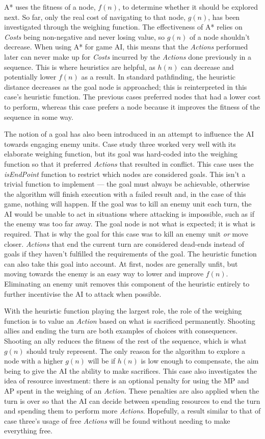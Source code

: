 \documentclass[11pt, a4paper]{report}
\begin{document}
A* uses the fitness of a node, $f(n)$, to determine whether it should be explored next. So far, only the real cost of navigating to that node, $g(n)$, has been investigated through the weighing function. The effectiveness of A* relies on \emph{Costs} being non-negative and never losing value, so $g(n)$ of a node shouldn't decrease. When using A* for game AI, this means that the \emph{Actions} performed later can never make up for \emph{Costs} incurred by the \emph{Actions} done previously in a sequence. This is where heuristics are helpful, as $h(n)$ can decrease and potentially lower $f(n)$ as a result. In standard pathfinding, the heuristic distance decreases as the goal node is approached; this is reinterpreted in this case's heuristic function. The previous cases preferred nodes that had a lower cost to perform, whereas this case prefers a node because it improves the fitness of the sequence in some way. 

The notion of a goal has also been introduced in an attempt to influence the AI towards engaging enemy units. Case study three worked very well with its elaborate weighing function, but its goal was hard-coded into the weighing function so that it preferred \emph{Actions} that resulted in conflict. This case uses the \emph{isEndPoint} function to restrict which nodes are considered goals. This isn't a trivial function to implement --- the goal must always be achievable, otherwise the algorithm will finish execution with a failed result and, in the case of this game, nothing will happen. If the goal was to kill an enemy unit each turn, the AI would be unable to act in situations where attacking is impossible, such as if the enemy was too far away. The goal node is not what is expected; it is what is required. That is why the goal for this case was to kill an enemy unit \emph{or} move closer. \emph{Actions} that end the current turn are considered dead-ends instead of goals if they haven't fulfilled the requirements of the goal. The heuristic function can also take this goal into account. At first, nodes are generally unfit, but moving towards the enemy is an easy way to lower and improve $f(n)$. Eliminating an enemy unit removes this component of the heuristic entirely to further incentivise the AI to attack when possible. 

With the heuristic function playing the largest role, the role of the weighing function is to value an \emph{Action} based on what is sacrificed permanently. Shooting allies and ending the turn are both examples of choices with consequences. Shooting an ally reduces the fitness of the rest of the sequence, which is what $g(n)$ should truly represent. The only reason for the algorithm to explore a node with a higher $g(n)$ will be if $h(n)$ is low enough to compensate, the aim being to give the AI the ability to make sacrifices. This case also investigates the idea of resource investment: there is an optional penalty for using the MP and AP spent in the weighing of an \emph{Action}. These penalties are also applied when the turn is over so that the AI can decide between spending resources to end the turn and spending them to perform more \emph{Actions}. Hopefully, a result similar to that of case three's usage of free \emph{Actions} will be found without needing to make everything free.
\end{document}
